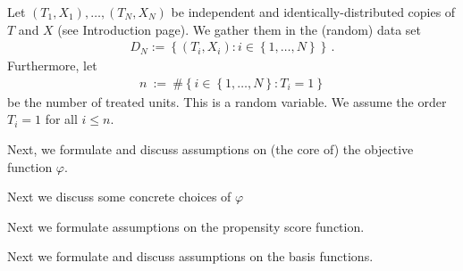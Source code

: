 Let $(T_1,X_1),\ldots,(T_N,X_N)$ be independent and identically-distributed copies of $T$ and $X$ (see Introduction page). 
We gather them in the (random) data set 
\begin{gather*}
D_N:=\left\{ (T_i,X_i)\colon i\in \left\{ 1,\ldots,N \right\} \right\}
\,.
\end{gather*}
Furthermore, let
\begin{gather*}
  n
  \ 
  :=
  \ 
  \# 
  \left\{ 
    i\in \left\{ 1,\ldots,N \right\}
    \colon
    T_i=1
  \right\}
\end{gather*}
be the number of treated units. This is a random variable. We assume the order $T_i=1$ for all $i\le n$.



Next, we formulate and discuss assumptions on (the core of) the objective function $\varphi$.



Next we discuss some concrete choices of $\varphi$



Next we formulate assumptions on the propensity score function.



Next we formulate and discuss assumptions on the basis functions.


